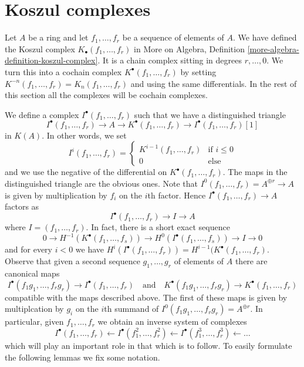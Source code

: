 \section{Koszul complexes}
\label{section-koszul}

\noindent
Let $A$ be a ring and let $f_1, \ldots, f_r$ be a sequence of elements
of $A$. We have defined the Koszul complex
$K_\bullet(f_1, \ldots, f_r)$ in
More on Algebra, Definition \ref{more-algebra-definition-koszul-complex}.
It is a chain complex sitting in degrees $r, \ldots, 0$.
We turn this into a cochain complex $K^\bullet(f_1, \ldots, f_r)$
by setting $K^{-n}(f_1, \ldots, f_r) = K_n(f_1, \ldots, f_r)$
and using the same differentials. In the rest of this section all
the complexes will be cochain complexes.

\medskip\noindent
We define a complex $I^\bullet(f_1, \ldots, f_r)$
such that we have a distinguished triangle
$$
I^\bullet(f_1, \ldots, f_r) \to
A \to
K^\bullet(f_1, \ldots, f_r) \to
I^\bullet(f_1, \ldots, f_r)[1]
$$
in $K(A)$.
In other words, we set
$$
I^i(f_1, \ldots, f_r) =
\left\{
\begin{matrix}
K^{i - 1}(f_1, \ldots, f_r) & \text{if } i \leq 0 \\
0 & \text{else}
\end{matrix}
\right.
$$
and we use the negative of the differential on $K^\bullet(f_1, \ldots, f_r)$.
The maps in the distinguished triangle are the obvious ones. Note that
$I^0(f_1, \ldots, f_r) = A^{\oplus r} \to A$ is given by
multiplication by $f_i$ on the $i$th factor.
Hence $I^\bullet(f_1, \ldots, f_r) \to A$ factors as
$$
I^\bullet(f_1, \ldots, f_r) \to I \to A
$$
where $I = (f_1, \ldots, f_r)$. In fact, there is a short exact sequence
$$
0 \to H^{-1}(K^\bullet(f_1, \ldots, f_s)) \to
H^0(I^\bullet(f_1, \ldots, f_s)) \to I \to 0
$$
and for every $i < 0$ we have
$H^i(I^\bullet(f_1, \ldots, f_r)) = H^{i - 1}(K^\bullet(f_1, \ldots, f_r)$.
Observe that given a second sequence $g_1, \ldots, g_r$ of elements of $A$
there are canonical maps
$$
I^\bullet(f_1g_1, \ldots, f_rg_r) \to I^\bullet(f_1, \ldots, f_r)
\quad\text{and}\quad
K^\bullet(f_1g_1, \ldots, f_rg_r) \to K^\bullet(f_1, \ldots, f_r)
$$
compatible with the maps described above. The first of these maps is
given by multiplcation by $g_i$ on the $i$th summand of
$I^0(f_1g_1, \ldots, f_rg_r) = A^{\oplus r}$. In particular, given
$f_1, \ldots, f_r$ we obtain an inverse system of complexes
\begin{equation}
\label{equation-system}
I^\bullet(f_1, \ldots, f_r) \leftarrow
I^\bullet(f_1^2, \ldots, f_r^2) \leftarrow
I^\bullet(f_1^3, \ldots, f_r^3) \leftarrow \ldots
\end{equation}
which will play an important role in that which is to follow.
To easily formulate the following lemmas we fix some notation.

